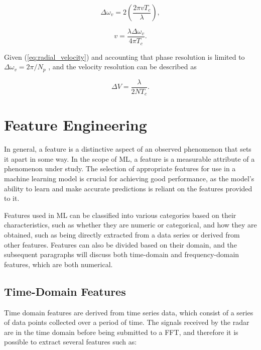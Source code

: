 \begin{equation}
    \label{eq:phase_diff_movingtargets}
      \Delta \omega_v = 2 \left(\frac{2\pi v T_c}{\lambda} \right),
\end{equation}

\begin{equation} \label{eq:radial_velocity}
    v = \frac{\lambda \Delta \omega_v }{4\pi T_c}. 
\end{equation}

Given (\ref{eq:radial_velocity}) and accounting that phase resolution is limited to $\Delta \omega_v = 2\pi / N_p$ \cite{velocityRadar}, and the velocity resolution can be described as

\begin{equation} \label{eq:20equation}
    \Delta V = \frac{\lambda}{2NT_c}.
\end{equation}

\section{Feature Engineering}
\label{sec:featureEngineering}
In general, a feature is a distinctive aspect of an observed phenomenon that sets it apart in some way. In the scope of \gls{ML}, a feature is a measurable attribute of a phenomenon under study. The selection of appropriate features for use in a machine learning model is crucial for achieving good performance, as the model's ability to learn and make accurate predictions is reliant on the features provided to it. 

Features used in \gls{ML} can be classified into various categories based on their characteristics, such as whether they are numeric or categorical, and how they are obtained, such as being directly extracted from a data series or derived from other features. Features can also be divided based on their domain, and the subsequent paragraphs will discuss both time-domain and frequency-domain features, which are both numerical.

\subsection{Time-Domain Features}
\label{subsec:timeDomainFeatures}
Time domain features are derived from time series data, which consist of a series of data points collected over a period of time. The signals received by the radar are in the time domain before being submitted to a \gls{FFT}, and therefore it is possible to extract several features such as:

